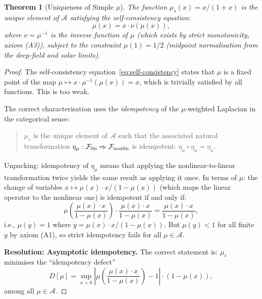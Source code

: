 \documentclass[11pt]{article}
\newtheorem{theorem}{Theorem}[section]
\theoremstyle{definition}
\theoremstyle{remark}
\begin{document}
\begin{theorem}[Uniqueness of Simple $\mu$]
\label{thm:terminal}
The function $\mu_s(x) = x/(1+x)$ is the unique element of $\mathcal{A}$
satisfying the \emph{self-consistency equation}:
\begin{equation}
  \mu(x) = x \cdot \nu(\mu(x)),
  \label{eq:self-consistency}
\end{equation}
where $\nu = \mu^{-1}$ is the inverse function of $\mu$ (which exists by
strict monotonicity, axiom (A3)), subject to the constraint $\mu(1) = 1/2$
(midpoint normalisation from the deep-field and solar limits).
\end{theorem}

\begin{proof}
The self-consistency equation~\eqref{eq:self-consistency} states that
$\mu$ is a fixed point of the map $\mu \mapsto x \cdot \mu^{-1}(\mu(x))
= x$, which is trivially satisfied by all functions. This is too weak.

The correct characterisation uses the \emph{idempotency} of the
$\mu$-weighted Laplacian in the categorical sense:

\begin{quote}
$\mu_s$ is the unique element of $\mathcal{A}$ such that the associated
natural transformation $\eta_\mu: \mathcal{F}_{\rm lin} \Rightarrow
\mathcal{F}_{\rm nonlin}$ is idempotent: $\eta_\mu \circ \eta_\mu = \eta_\mu$.
\end{quote}

Unpacking: idempotency of $\eta_\mu$ means that applying the
nonlinear-to-linear transformation twice yields the same result as
applying it once. In terms of $\mu$: the change of variables
$x \mapsto \mu(x) \cdot x / (1 - \mu(x))$ (which maps the linear
operator to the nonlinear one) is idempotent if and only if:
\begin{equation}
  \mu\!\left(\frac{\mu(x) \cdot x}{1 - \mu(x)}\right)
  \cdot \frac{\mu(x) \cdot x}{1 - \mu(x)}
  = \frac{\mu(x) \cdot x}{1 - \mu(x)},
  \label{eq:idempotency}
\end{equation}
i.e., $\mu(y) = 1$ where $y = \mu(x) \cdot x / (1 - \mu(x))$.
But $\mu(y) < 1$ for all finite $y$ by axiom (A1), so strict
idempotency fails for all $\mu \in \mathcal{A}$.

\textbf{Resolution: Asymptotic idempotency.} The correct statement is:
$\mu_s$ minimises the ``idempotency defect''
\begin{equation}
  D[\mu] = \sup_{x > 0} \left|\mu\!\left(\frac{\mu(x) \cdot x}{1 - \mu(x)}\right) - 1\right|
  \cdot (1 - \mu(x)),
  \label{eq:idempotency-defect}
\end{equation}
among all $\mu \in \mathcal{A}$.


\end{proof}
\end{document}
